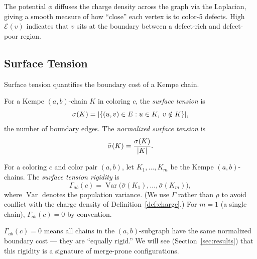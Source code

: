 The potential $\phi$ diffuses the charge density across the graph via
the Laplacian, giving a smooth measure of how ``close'' each vertex is
to color-5 defects. High $\mathcal{E}(v)$ indicates that $v$ sits at
the boundary between a defect-rich and defect-poor region.

\subsection{Surface Tension}\label{sec:surface-tension}

Surface tension quantifies the boundary cost of a Kempe chain.

\begin{definition}\label{def:surface-tension}
For a Kempe $(a,b)$-chain $K$ in coloring $c$, the \emph{surface
tension} is
\begin{equation}\label{eq:surface-tension}
  \sigma(K) = \lvert \{(u, v) \in E : u \in K,\; v \notin K\} \rvert,
\end{equation}
the number of boundary edges. The \emph{normalized surface tension} is
\begin{equation}\label{eq:normalized-st}
  \bar{\sigma}(K) = \frac{\sigma(K)}{\lvert K \rvert}.
\end{equation}
\end{definition}

\begin{definition}\label{def:st-rigidity}
For a coloring $c$ and color pair $(a,b)$, let
$K_1, \ldots, K_m$ be the Kempe $(a,b)$-chains. The \emph{surface
tension rigidity} is
\begin{equation}\label{eq:st-rigidity}
  \Gamma_{ab}(c) =
  \operatorname{Var}\bigl(\bar{\sigma}(K_1), \ldots,
  \bar{\sigma}(K_m)\bigr),
\end{equation}
where $\operatorname{Var}$ denotes the population variance. (We use
$\Gamma$ rather than $\rho$ to avoid conflict with the charge density
of Definition~\ref{def:charge}.) For $m = 1$ (a single chain),
$\Gamma_{ab}(c) = 0$ by convention.
\end{definition}

\begin{remark}\label{rem:st-interpretation}
$\Gamma_{ab}(c) = 0$ means all chains in the $(a,b)$-subgraph have the
same normalized boundary cost — they are ``equally rigid.'' We will see
(Section~\ref{sec:results}) that this rigidity is a signature of
merge-prone configurations.
\end{remark}


